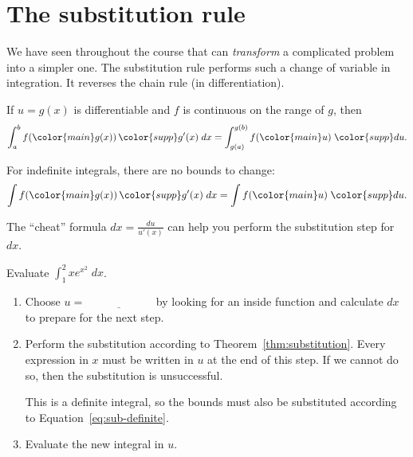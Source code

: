 \documentclass[../main.tex]{subfiles}
\begin{document}
 \section{The substitution rule}

We have seen throughout the course that  can \emph{transform} a complicated problem into a simpler one. The substitution rule performs such a change of variable in integration. It reverses the chain rule (in differentiation).

\begin{thm} \label{thm:substitution}
  {If {\color{main} \(u = g(x)\)} is differentiable and \(f\) is continuous on the range of \(g\), then}
  \begin{equation} \label{eq:sub-definite}
    \int_{a}^{b} f( {\color{main} g(x)} ) \, {\color{supp} g'(x) \;dx} = \int_{g(a)}^{g(b)} f({\color{main} u}) \;{\color{supp}du}.
  \end{equation}

  For indefinite integrals, there are no bounds to change:
  \begin{equation} \label{eq:sub-indefinite}
    \int f( {\color{main} g(x)} ) \, {\color{supp} g'(x) \;dx} = \int f({\color{main} u}) \;{\color{supp}du}.
  \end{equation}

  The \enquote{cheat} formula \(dx = \frac{du}{u'(x)}\) can help you perform the substitution step for \(dx\).

\end{thm}

\medskip
\begin{example}
  Evaluate \(\int_{1}^{2} x e^{x^{2}} \;dx\).

  \begin{enumerate}[wide]
    \item Choose \(u = \underline{\hspace{1in}}\) by looking for an inside function and calculate \(dx\) to prepare for the next step.


    \item Perform the substitution according to Theorem~\ref{thm:substitution}. Every expression in \(x\) must be written in \(u\) at the end of this step. If we cannot do so, then the substitution is unsuccessful. 

      This is a definite integral, so the bounds must also be substituted according to Equation~\eqref{eq:sub-definite}.


    \item Evaluate the new integral in \(u\).

      \blanks*
  \end{enumerate}
\end{example}
\clearpage
\end{document}
